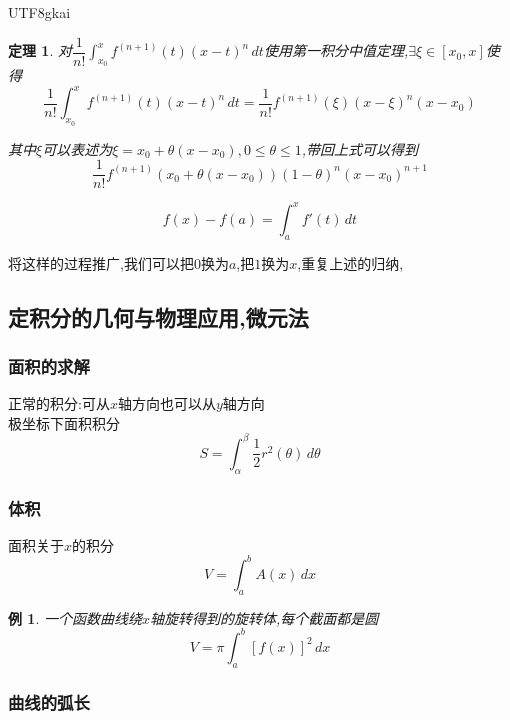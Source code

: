 \documentclass{article}
\newtheorem{theorem}{定理}[subsection]
\newtheorem{example}{例}[subsection]
\newenvironment{cproof}{%
\heiti{证明}\kaishu
}{%
}
\begin{document}
\begin{CJK}{UTF8}{gkai}
\begin{theorem}
对$ \dfrac{1}{n!}\int_{x_0}^{x} f^{(n + 1)}(t) (x - t)^n\,dt$使用第一积分中值定理,$\exists \xi \in [x_0,x]$使得
\[\dfrac{1}{n!}\int_{x_0}^{x} f^{(n + 1)}(t) (x - t)^n\,dt = \dfrac{1}{n!}f^{(n + 1)}(\xi) (x - \xi)^n (x - x_0)\]

其中$\xi$可以表述为$\xi = x_0 + \theta (x - x_0),0\leq \theta \leq 1$,带回上式可以得到
\[\dfrac{1}{n!} f^{(n + 1)}(x_0 + \theta(x - x_0))(1 - \theta)^n (x - x_0)^{n + 1}\]
\end{theorem}

\begin{cproof}
\[f(x) - f(a) = \int_{a}^{x}f'(t)\,dt\]


将这样的过程推广,我们可以把$0$换为$a$,把$1$换为$x$,重复上述的归纳,
\end{cproof}
\subsection{定积分的几何与物理应用,微元法}
\subsubsection{面积的求解}
正常的积分:可从$x$轴方向也可以从$y$轴方向\\

极坐标下面积积分
\[S = \int_{\alpha}^{\beta}\dfrac{1}{2} r^2(\theta)\,d\theta\]

\subsubsection{体积}
面积关于$x$的积分
\[ V = \int_{a}^{b}A(x)\, dx\]

\begin{example}
  一个函数曲线绕$x$轴旋转得到的旋转体,每个截面都是圆\\
  \[V = \pi \int_{a}^{b}  [f(x)]^2 \, dx\]
\end{example}

\subsubsection{曲线的弧长}


\end{CJK}
\end{document}
